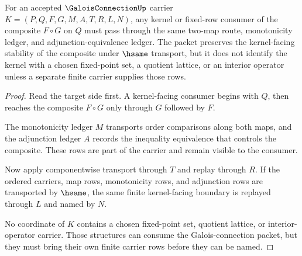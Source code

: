 \begin{theorem}
\label{thm:galois-connection-kernel-stability}
For an accepted $\GaloisConnectionUp$ carrier $K=(P,Q,F,G,M,A,T,R,L,N)$, any kernel or fixed-row consumer of the composite $F\circ G$ on $Q$ must pass through the same two-map route, monotonicity ledger, and adjunction-equivalence ledger. The packet preserves the kernel-facing stability of the composite under $\hsame$ transport, but it does not identify the kernel with a chosen fixed-point set, a quotient lattice, or an interior operator unless a separate finite carrier supplies those rows.
\end{theorem}
\begin{proof}
Read the target side first. A kernel-facing consumer begins with $Q$, then reaches the composite $F\circ G$ only through $G$ followed by $F$.

The monotonicity ledger $M$ transports order comparisons along both maps, and the adjunction ledger $A$ records the inequality equivalence that controls the composite. These rows are part of the carrier and remain visible to the consumer.

Now apply componentwise transport through $T$ and replay through $R$. If the ordered carriers, map rows, monotonicity rows, and adjunction rows are transported by $\hsame$, the same finite kernel-facing boundary is replayed through $L$ and named by $N$.

No coordinate of $K$ contains a chosen fixed-point set, quotient lattice, or interior-operator carrier. Those structures can consume the Galois-connection packet, but they must bring their own finite carrier rows before they can be named.
\end{proof}




